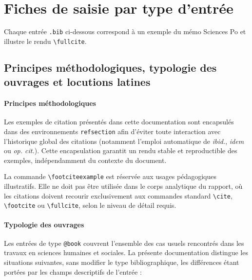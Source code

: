 \documentclass{article}
\begin{document}
\section{Fiches de saisie par type d'entrée}
Chaque entrée \texttt{.bib} ci-dessous correspond à un exemple du mémo Sciences Po et illustre le rendu \texttt{\textbackslash fullcite}.

\subsection{Principes méthodologiques, typologie des ouvrages et locutions latines}

\paragraph{Principes méthodologiques}

Les exemples de citation présentés dans cette documentation sont encapsulés
dans des environnements \texttt{refsection} afin d'éviter toute interaction
avec l'historique global des citations (notamment l'emploi automatique de
\emph{ibid.}, \emph{idem} ou \emph{op. cit.}). Cette encapsulation garantit
un rendu stable et reproductible des exemples, indépendamment du contexte
du document.

La commande \texttt{\textbackslash footciteexample} est réservée aux usages
pédagogiques illustratifs. Elle ne doit pas être utilisée dans le corps
analytique du rapport, où les citations doivent recourir exclusivement aux
commandes standard \texttt{\textbackslash cite},
\texttt{\textbackslash footcite} ou \texttt{\textbackslash fullcite},
selon le niveau de détail requis.

\paragraph{Typologie des ouvrages}

Les entrées de type \texttt{@book} couvrent l'ensemble des cas usuels rencontrés
dans les travaux en sciences humaines et sociales. La présente documentation
distingue les situations suivantes, sans modifier le type bibliographique,
les différences étant portées par les champs descriptifs de l'entrée :
\end{document}
